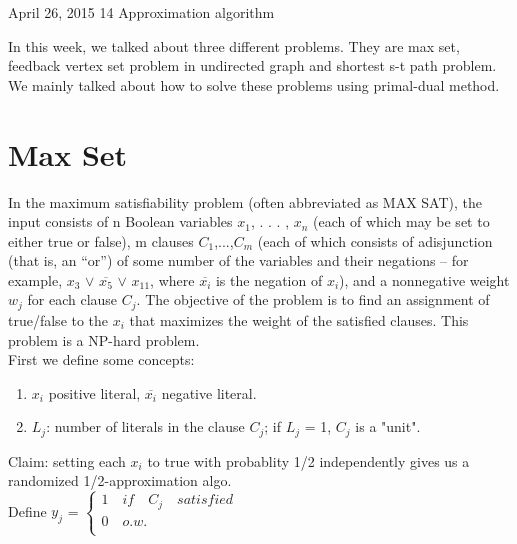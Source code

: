 \documentclass[usletter]{article}
\begin{document}
           {April 26, 2015}                          %
           {14}                                       %
           {Approximation algorithm}  %

\noindent
In this week, we talked about three different problems. They are max set, feedback vertex set problem in undirected graph and shortest s-t path problem. We mainly talked about how to solve these problems using primal-dual method.

\section{Max Set}
In the maximum satisfiability problem (often abbreviated as MAX SAT), the input consists of n Boolean variables $x_1$, . . . , $x_n$ (each of which may be set to either true or false), m clauses $C_1$,...,$C_m$ (each of which consists of adisjunction (that is, an “or”) of some number of the variables and their negations – for example, $x_3$ $\vee$ $\overline{x_5}$ $\vee$ $x_{11}$, where  $\overline{x_i}$ is the negation of $x_i$), and a nonnegative weight $w_j$ for each clause $C_j$. The objective of the problem is to find an assignment of true/false to the $x_i$ that maximizes the weight of the satisfied clauses. This problem is a NP-hard problem.\\


First we define some concepts:
\begin{enumerate}
	\item $x_i$ positive literal, $\overline{x_i}$ negative literal. 
	\item $L_j$: number of literals in the clause $C_j$; if $L_j$ = 1, $C_j$ is a "unit".
\end{enumerate}

Claim: setting each $x_i$ to true with probablity 1/2 independently gives us a randomized 1/2-approximation algo. \\

Define $y_j$ = $\left\{
\begin{array}{c}
1 \quad if \quad C_j \quad satisfied\\
0 \quad o.w.\\
\end{array}
\right.$
\end{document}
